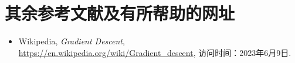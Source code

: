 \documentclass[printMode=false, declarePage=false]{ecnuthesis}
\begin{document}
\PrintReference

\newpage

\section*{其余参考文献及有所帮助的网址}

\begin{itemize}
    \item Wikipedia, \textit{Gradient Descent}, \url{https://en.wikipedia.org/wiki/Gradient_descent}, 访问时间：2023年6月9日.
\end{itemize}
\end{document}
